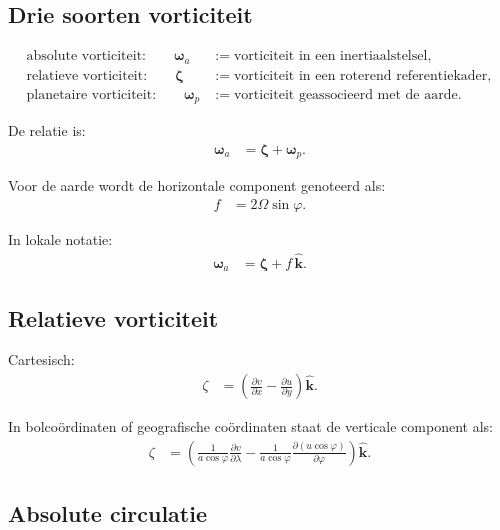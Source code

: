 \documentclass[11pt]{article}
\newcommand{\vect}[1]{\mathbf{#1}}
\begin{document}
\subsection*{Drie soorten vorticiteit}

\begin{align*}
\text{absolute vorticiteit:}\qquad
\bm{\omega}_a
  &:=
  \text{vorticiteit in een inertiaalstelsel},
\\
\text{relatieve vorticiteit:}\qquad
\bm{\zeta}
  &:=
  \text{vorticiteit in een roterend referentiekader},
\\
\text{planetaire vorticiteit:}\qquad
\bm{\omega}_p
  &:=
  \text{vorticiteit geassocieerd met de aarde}.
\end{align*}

De relatie is:
\begin{align*}
\bm{\omega}_a
  &=
  \bm{\zeta}
  +\bm{\omega}_p.
\end{align*}

Voor de aarde wordt de horizontale component genoteerd als:
\begin{align*}
f
  &=
  2\Omega\sin\varphi.
\end{align*}

In lokale notatie:
\begin{align*}
\bm{\omega}_a
  &=
  \bm{\zeta}
  + f\,\hat{\vect{k}}.
\end{align*}

\subsection*{Relatieve vorticiteit}

Cartesisch:
\begin{align*}
\zeta
  &=
  \left(
  \frac{\partial v}{\partial x}
  -
  \frac{\partial u}{\partial y}
  \right)\hat{\vect{k}}.
\end{align*}

In bolcoördinaten of geografische coördinaten staat de verticale component als:
\begin{align*}
\zeta
  &=
  \left(
  \frac{1}{a\cos\varphi}
  \frac{\partial v}{\partial \lambda}
  -
  \frac{1}{a\cos\varphi}
  \frac{\partial \left(u\cos\varphi\right)}{\partial \varphi}
  \right)\hat{\vect{k}}.
\end{align*}

\subsection*{Absolute circulatie}
\end{document}
